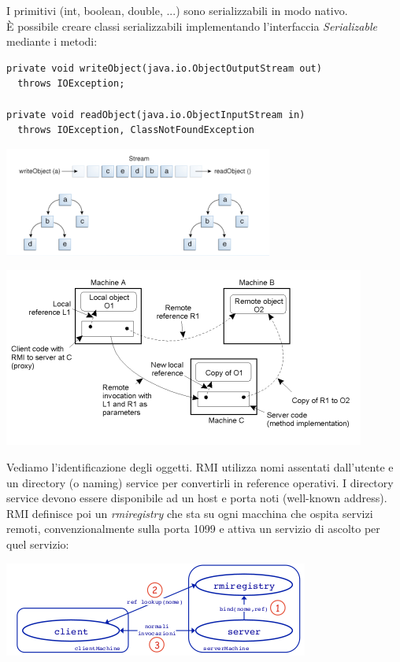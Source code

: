 \documentclass[a4paper,12pt, oneside]{book}
\begin{document}
I primitivi (int, boolean, double, ...) sono serializzabili in modo nativo.\\
È possibile creare classi serializzabili implementando
l'interfaccia \textit{Serializable} mediante i metodi:
\begin{verbatim}
private void writeObject(java.io.ObjectOutputStream out)
  throws IOException;

private void readObject(java.io.ObjectInputStream in)
  throws IOException, ClassNotFoundException
\end{verbatim}
\begin{center}
\includegraphics[scale=0.7]{img/rmi3.png}
\end{center}
\begin{center}
\includegraphics[scale=0.7]{img/rmi4.png}
\end{center}
Vediamo l'identificazione degli oggetti. RMI utilizza nomi assentati dall’utente e un directory (o naming) service per convertirli in reference operativi.
I directory service devono essere disponibile ad un
host e porta noti (well-known address).\\
RMI definisce poi un \textit{rmiregistry} che sta su ogni macchina che ospita servizi remoti, convenzionalmente sulla porta 1099 e
attiva un servizio di ascolto per quel servizio:
\begin{center}
\includegraphics[scale=0.7]{img/rmi5.png}
\end{center}
\end{document}
